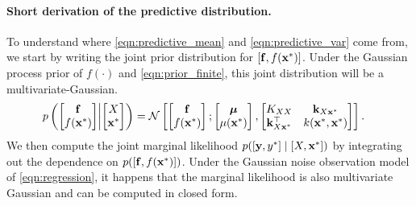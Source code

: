 \paragraph{Short derivation of the predictive distribution.}
To understand where \cref{eqn:predictive_mean} and \cref{eqn:predictive_var} come from, we start by writing the joint prior distribution for $[\mathbf{f}, f(\mathbf{x}^*)]$.
Under the Gaussian process prior of $f(\cdot)$ and \cref{eqn:prior_finite}, this joint distribution will be a multivariate-Gaussian.
%
\begin{align*}
  p \left(
    \begin{bmatrix} \bfn \\ f(\bxtest) \end{bmatrix} \middle|
    \begin{bmatrix} \bX \\ \bxtest \end{bmatrix}
  \right)
  &= \normaldist{
    \begin{bmatrix} \bfn \\ f(\bxtest) \end{bmatrix} ;
    \begin{bmatrix} \bmu \\ \mu(\bxtest) \end{bmatrix}
  }{
    \begin{bmatrix}
      \bK_{\bX \bX}    & \bk_{\bX \bxtest} \\
      \bk_{\bX \bxtest}^\top   & k(\bxtest, \bxtest)
    \end{bmatrix}
  }.
\end{align*}
%
We then compute the joint marginal likelihood $p( [ \mathbf{y}, y^* ] \mid [ X, \mathbf{x}^* ] )$ by integrating out the dependence on $p( [\mathbf{f}, f(\mathbf{x}^*)] )$.
Under the Gaussian noise observation model of \cref{eqn:regression}, it happens that the marginal likelihood is also multivariate Gaussian and can be computed in closed form.
%

